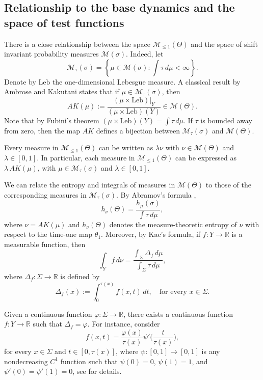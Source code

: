 \documentclass[letterpaper,11pt]{amsart}
\numberwithin{equation}{section}     %
\newcommand{\M}{\mathcal{M}}
\newcommand{\R}{\mathbb{R}}
\def\L{{\text{Leb}}}
\def\phi{\varphi}
\def\R{{\mathbb R}}
\def\M{{\mathcal M}}
\def\M{\mathcal{M}}
\begin{document}
\subsection{Relationship to the base dynamics and the space of test functions} \label{sec:test_flow}
There is a close relationship  between the space $\M_{\leq 1}(\Theta)$ and the space of shift invariant probability measures  $\M(\sigma)$. Indeed, 
let
\begin{equation*}
\M_\tau(\sigma)= \left\{ \mu \in \mathcal{M}(\sigma): \int \tau \, d \mu < \infty \right\}.
\end{equation*}
Denote by $\L$ the  one-dimensional Lebesgue measure. A classical result by Ambrose and Kakutani \cite{ak} states that if $\mu \in \M_\tau(\sigma)$, then 
\begin{equation*} \label{ak} 
AK(\mu):=\frac{(\mu \times \L)|_{Y} }{(\mu \times \L)(Y)} \in \M(\Theta).
\end{equation*}
Note that by Fubini's theorem $(\mu \times \L)(Y)=\int \tau \, d\mu$. If $\tau$ is bounded away from zero, then the map $AK$ defines a bijection between $\M_\tau(\sigma)$ and $\M(\Theta)$.  

Every measure in $\M_{\leq 1}(\Theta)$ can be written as $\lambda \nu$ with $\nu \in \M(\Theta)$ and $\lambda \in [0,1]$. In particular, each measure in $\M_{\leq 1}(\Theta)$ can be expressed as $\lambda \, AK(\mu)$, with $\mu \in \M_\tau(\sigma)$ and $\lambda \in [0,1]$.  




We can relate the entropy and integrals of measures in $\M(\Theta)$ to those of the corresponding measures in $\M_\tau(\sigma)$. 
By Abramov's formula \cite{a}, 
\[
h_\nu(\Theta) = \frac{h_\mu(\sigma)}{\int \tau \, d\mu},
\]  
where $\nu = AK(\mu)$ and $h_\nu(\Theta)$ denotes the measure-theoretic entropy of $\nu$ with respect to the time-one map $\theta_1$.  Moreover, by Kac's formula, if $f : Y \to \R$ is a measurable function, then
\[
\int_Y f \, d\nu = \frac{\int_\Sigma \Delta_f \, d\mu}{\int_\Sigma \tau \, d\mu},
\]  
where $\Delta_f : \Sigma \to \R$ is defined by
\[
\Delta_f(x) := \int_0^{\tau(x)} f(x,t) \, dt, \quad \text{for every } x \in \Sigma.
\]





\begin{remark}\label{rem:ex} Given a continuous function $\phi:\Sigma\to\R$, there exists a continuous function $f:Y\to\R$ such that $\Delta_f=\phi$. For instance, consider $$f(x,t)=\frac{\phi(x)}{\tau(x)}\psi'\bigg(\frac{t}{\tau(x)}\bigg),$$ for every $x\in \Sigma$ and $t\in [0,\tau(x)]$, where $\psi:[0,1]\to[0,1]$ is any nondecreasing $C^1$ function such that $\psi(0)=0$, $\psi(1)=1$, and $\psi'(0)=\psi'(1)=0$, see \cite{brw} for details. 
\end{remark}
\end{document}
